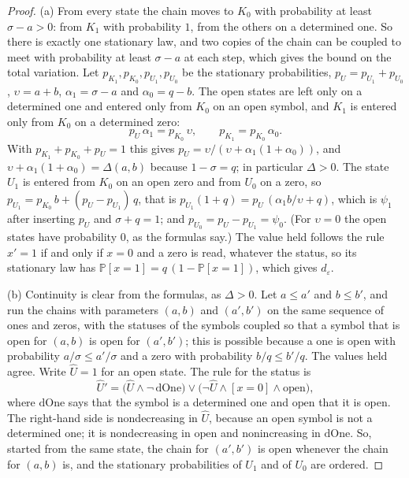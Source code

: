 \documentclass[11pt]{amsart}
\theoremstyle{definition}
\theoremstyle{remark}
\newcommand{\eps}{\varepsilon}
\newcommand{\PP}{\mathbb{P}}
\begin{document}
\begin{proof}
(a) From every state the chain moves to $K_0$ with probability at least $\sigma-a>0$: from $K_1$
with probability $1$, from the others on a determined one. So there is exactly one stationary law,
and two copies of the chain can be coupled to meet with probability at least $\sigma-a$ at each
step, which gives the bound on the total variation. Let $p_{K_1},p_{K_0},p_{U_1},p_{U_0}$ be the
stationary probabilities, $p_U=p_{U_1}+p_{U_0}$, $\upsilon=a+b$, $\alpha_1=\sigma-a$ and $\alpha_0=q-b$. The
open states are left only on a determined one and entered only from $K_0$ on an open symbol, and
$K_1$ is entered only from $K_0$ on a determined zero:
\[
p_U\,\alpha_1=p_{K_0}\,\upsilon,\qquad p_{K_1}=p_{K_0}\,\alpha_0 .
\]
With $p_{K_1}+p_{K_0}+p_U=1$ this gives $p_U=\upsilon/(\upsilon+\alpha_1(1+\alpha_0))$, and
$\upsilon+\alpha_1(1+\alpha_0)=\Delta(a,b)$ because $1-\sigma=q$; in particular $\Delta>0$. The state $U_1$
is entered from $K_0$ on an open zero and from $U_0$ on a zero, so
$p_{U_1}=p_{K_0}\,b+(p_U-p_{U_1})\,q$, that is
$p_{U_1}(1+q)=p_U\,(\alpha_1b/\upsilon+q)$, which is $\psi_1$ after inserting $p_U$ and $\sigma+q=1$;
and $p_{U_0}=p_U-p_{U_1}=\psi_0$. (For $\upsilon=0$ the open states have probability $0$, as the
formulas say.) The value held follows the rule $x'=1$ if and only if $x=0$ and a zero is read,
whatever the status, so its stationary law has $\PP[x=1]=q\,(1-\PP[x=1])$, which gives $d_\eps$.

(b) Continuity is clear from the formulas, as $\Delta>0$. Let $a\le a'$ and $b\le b'$, and run
the chains with parameters $(a,b)$ and $(a',b')$ on the same sequence of ones and zeros, with the
statuses of the symbols coupled so that a symbol that is open for $(a,b)$ is open for $(a',b')$;
this is possible because a one is open with probability $a/\sigma\le a'/\sigma$ and a zero with
probability $b/q\le b'/q$. The values held agree. Write $\hat U=1$ for an open state. The rule for
the status is
\begin{equation}\label{eq:statusrule}
\hat U'=\bigl(\hat U\wedge\neg\,\mathrm{dOne}\bigr)\vee\bigl(\neg\hat U\wedge[x=0]\wedge\mathrm{open}\bigr),
\end{equation}
where $\mathrm{dOne}$ says that the symbol is a determined one and $\mathrm{open}$ that it is
open. The right-hand side is nondecreasing in $\hat U$, because an open symbol is not a
determined one; it is nondecreasing in $\mathrm{open}$ and nonincreasing in $\mathrm{dOne}$. So,
started from the same state, the chain for $(a',b')$ is open whenever the chain for $(a,b)$ is,
and the stationary probabilities of $U_1$ and of $U_0$ are ordered.


\end{proof}
\end{document}
